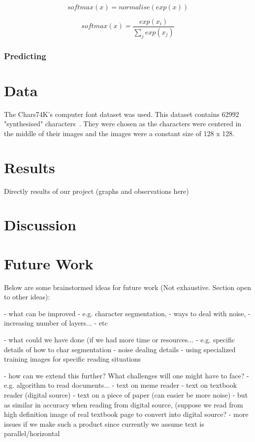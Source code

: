 \documentclass[11pt]{article}
\begin{document}
\begin{equation}
    softmax(x) = normalise(exp(x))
\end{equation}

\begin{equation}
    softmax(x) = \frac{exp(x_{i})}{\sum_{j} exp(x_{j})}
\end{equation}


\subsubsection{Predicting}

\section{Data}
The Chars74K's computer font dataset was used. This dataset contains 62992 "synthesised" characters~\cite{deCampos09}. They were chosen as the characters were centered in the middle of their images and the images were a constant size of 128 x 128.

\section{Results}
Directly results of our project (graphs and observations here)

\section{Discussion}


\section{Future Work}
Below are some brainstormed ideas for future work (Not exhaustive.  Section open to other ideas): 

- what can be improved 
    - e.g. character segmentation, 
    - ways to deal with noise, 
    - increasing number of layers...
    - etc
    
- what could we have done (if we had more time or resources...
    - e.g. specific details of how to char segmentation
    - noise dealing details
    - using specialized training images for specific
        reading situations
    
- how can we extend this further? What challenges will one might have to face?
    - e.g. algorithm to read documents...
    - text on meme reader
    - text on textbook reader (digital source)
    - text on a piece of paper (can easier be more noise)
        - but as similar in accuracy when reading from digital source, (suppose we read from high definition image of real textbook page to convert into digital source?
            - more issues if we make such a product since currently we assume text is parallel/horizontal
    
\end{document}
